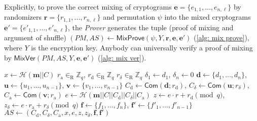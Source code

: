Explicitly, to prove the correct mixing of cryptograms $\boldsymbol{e} = \{ e_{1, 1}, ..., e_{n, \ell} \}$ by randomizers $\boldsymbol{r} = \{ r_{1, 1}, ..., r_{n, \ell} \}$ and permutation $\psi$ into the mixed cryptograms $\boldsymbol{e'} = \{ e'_{1, 1}, ..., e'_{n, \ell} \}$, the \textit{Prover} generates the tuple (proof of mixing and argument of shuffle) $(PM, AS) \gets \mathsf{MixProve}(\psi, Y, \boldsymbol{r}, \boldsymbol{e}, \boldsymbol{e'})$ (\cref{alg: mix prove}), where $Y$ is the encryption key. Anybody can universally verify a proof of mixing by $\mathsf{MixVer}(PM, AS, Y, \boldsymbol{e}, \boldsymbol{e'})$ (\cref{alg: mix ver}).

\begin{algorithm}[ht]
    \DontPrintSemicolon
    \caption{$\mathsf{ASKCProve}(\psi; r; \boldsymbol{m}; C)$}
    \label{alg: askc prove}
    
    $x \gets \mathcal{H}(\boldsymbol{m} || C)$ \;
    $r_\mathrm{a} \in_\mathrm{R} \mathbb{Z}_q$, $r_\mathrm{d} \in_\mathrm{R} \mathbb{Z}_q$ $r_\delta \in_\mathrm{R} \mathbb{Z}_q$ \;
    $\delta_1 \gets d_1$, $\delta_n \gets 0$ \;
    $\boldsymbol{d} \gets \{ d_1, ..., d_n \}$, $\boldsymbol{u} \gets \{ u_1, ..., u_{n-1} \}$, $\boldsymbol{v} \gets \{ v_1, ..., v_{n-1} \}$ \;
    $C_\mathrm{d} \gets \mathsf{Com} (\boldsymbol{d}; r_\mathrm{d})$, $C_\delta \gets \mathsf{Com} (\boldsymbol{u}; r_\delta)$, $C_\mathrm{a} \gets \mathsf{Com} (\boldsymbol{v}; r_\mathrm{a})$ \;
    $e \gets \mathcal{H}(\boldsymbol{m} || C || C_\mathrm{d} || C_\delta || C_\mathrm{a})$ \;
    $z \gets e \cdot r + r_\mathrm{d} \pmod q$, $z_\delta \gets e \cdot r_\mathrm{a} + r_\delta \pmod q$ \;
    $\boldsymbol{f} \gets \{ f_1, ..., f_n \}$, $\boldsymbol{f'} \gets \{ f'_1, ..., f'_{n-1} \}$ \;
    $AS \gets (C_\mathrm{d}, C_\delta, C_\mathrm{a}, x, e, z, z_\delta, \boldsymbol{f}, \boldsymbol{f'})$ \;
     
\end{algorithm}

